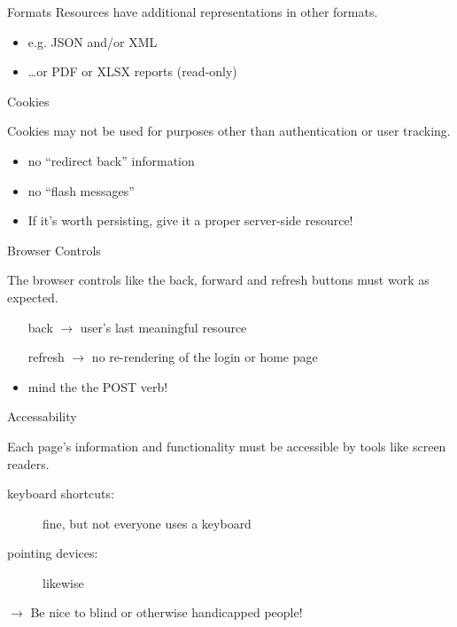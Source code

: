 \documentclass{beamer}
\begin{document}
\begin{frame}{Formats}
  Resources have additional representations in other formats.

  \begin{itemize}
    \item e.g. JSON and/or XML
    \item \dots or PDF or XLSX reports (read-only)
  \end{itemize}
\end{frame}

\begin{frame}{Cookies}

  Cookies may not be used for purposes other than authentication or user tracking.

  \begin{itemize}
    \item no ``redirect back'' information
    \item no ``flash messages''
    \item If it's worth persisting, give it a proper server-side resource!
  \end{itemize}
\end{frame}


\begin{frame}{Browser Controls}

  The browser controls like the back, forward and refresh buttons must work as expected.

  \begin{itemize}
    \item[back] \ensuremath{\rightarrow} user's last meaningful resource
    \item[refresh] \ensuremath{\rightarrow} no re-rendering of the login or home page
    \item mind the the POST verb!
  \end{itemize}
\end{frame}

\begin{frame}{Accessability}

  Each page's information and functionality must be accessible by tools like screen readers.

  \begin{description}
    \item[keyboard shortcuts:] fine, but not everyone uses a keyboard
    \item[pointing devices:] likewise
  \end{description}

  \ensuremath{\rightarrow} Be nice to blind or otherwise handicapped people!
\end{frame}
\end{document}
